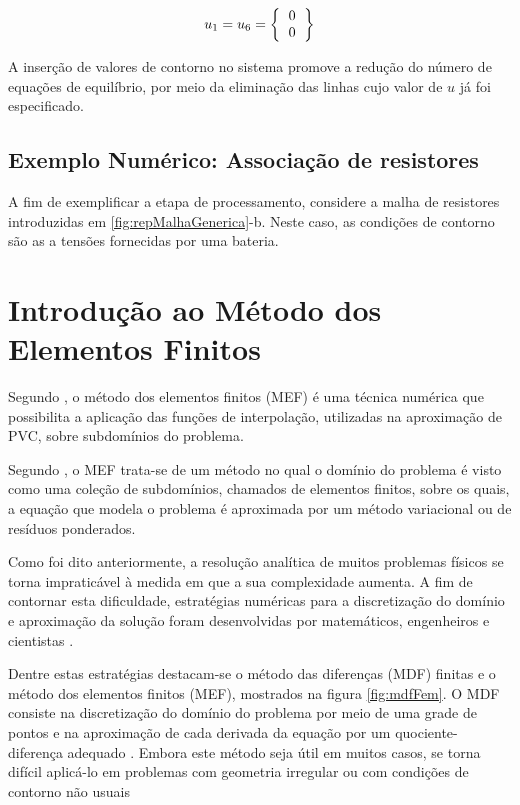\documentclass[
    12pt,               %
    openright,          %
    oneside,
    a4paper,            %
    english,            %
    french,             %
    spanish,            %
    brazil              %
    ]{abntex2}
\begin{document}
\begin{equation}
    \label{eq:condIni}
    u_1 = u_6 = 
        \left \{
        \begin{tabular}{c}
            $0$ \\
            $0$ \\
        \end{tabular}       
        \right \}   
\end{equation}

A inserção de valores de contorno no sistema promove a redução do número de equações de equilíbrio, por meio da eliminação das linhas cujo valor de $u$ já foi especificado.

\subsection{Exemplo Numérico: Associação de resistores}

A fim de exemplificar a etapa de processamento,  considere a malha de resistores introduzidas  em \ref{fig:repMalhaGenerica}-b. Neste caso, as condições de contorno são as a tensões fornecidas por uma bateria.



\section{Introdução ao Método dos Elementos Finitos}
\label{sec:MEF}

Segundo , o método dos elementos finitos (MEF) é uma técnica numérica que possibilita a aplicação das funções de interpolação, utilizadas na aproximação de PVC, sobre subdomínios do problema.

Segundo , o MEF trata-se de um método no qual o domínio do problema é visto como uma coleção de subdomínios, chamados de elementos finitos, sobre os quais, a equação que modela o problema é aproximada por um método variacional ou de resíduos ponderados.



Como foi dito anteriormente, a resolução analítica de muitos problemas físicos se torna impraticável à medida em que a sua  complexidade aumenta. 
A fim de contornar esta dificuldade, estratégias numéricas para a discretização do domínio e aproximação da solução foram desenvolvidas por matemáticos, engenheiros e cientistas \cite[p. 1]{zien}. 

Dentre estas estratégias destacam-se o método das diferenças (MDF) finitas e o método dos elementos finitos (MEF), mostrados na figura \ref{fig:mdfFem}. O MDF consiste na discretização do domínio do problema por meio de uma grade de pontos e na aproximação de cada derivada da equação por um quociente-diferença adequado
\cite[p. 684]{burdenFaires}. Embora este método seja útil em muitos casos, se torna difícil aplicá-lo em problemas com geometria irregular ou com condições de contorno não usuais \cite[p. 4]{huebner}
\end{document}
